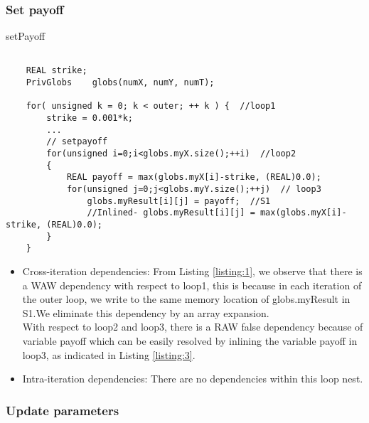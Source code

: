 \documentclass{article}
\begin{document}
\subsubsection*{Set payoff}
\begin{listing}[H]
\caption{setPayoff}
\begin{verbatim}
    
    REAL strike;
    PrivGlobs    globs(numX, numY, numT);
        
    for( unsigned k = 0; k < outer; ++ k ) {  //loop1
        strike = 0.001*k;
        ... 
        // setpayoff
        for(unsigned i=0;i<globs.myX.size();++i)  //loop2
        {
            REAL payoff = max(globs.myX[i]-strike, (REAL)0.0);
            for(unsigned j=0;j<globs.myY.size();++j)  // loop3
                globs.myResult[i][j] = payoff;  //S1
                //Inlined- globs.myResult[i][j] = max(globs.myX[i]-strike, (REAL)0.0); 
        }
    } 
\end{verbatim}
\label{listing:1}
\end{listing}

\begin{itemize}
    \item {Cross-iteration dependencies: From Listing \ref{listing:1}, we observe that there is a WAW dependency with respect to loop1, this is because in each iteration of the outer loop, we write to the same memory location of globs.myResult in S1.We eliminate this dependency by an array expansion.\\
    With respect to loop2 and loop3, there is a RAW false dependency because of variable payoff which can be easily resolved by inlining the variable payoff in loop3, as indicated in Listing \ref{listing:3}.  
    }
    \item {Intra-iteration dependencies: There are no dependencies within this loop nest.}
\end{itemize}
\subsubsection*{Update parameters}
\end{document}
